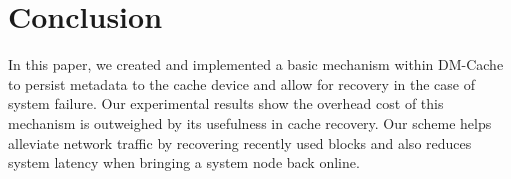 \section{Conclusion}
\label{sec:conclusion}

In this paper, we created and implemented a basic mechanism within
DM-Cache to persist metadata to the cache device and allow for
recovery in the case of system failure. Our experimental results show
the overhead cost of this mechanism is outweighed by its usefulness in
cache recovery. Our scheme helps alleviate network traffic by
recovering recently used blocks and also reduces system latency when
bringing a system node back online.
